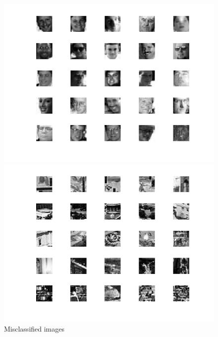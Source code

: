 \documentclass[a4paper,12pt]{article}
\begin{document}
\begin{figure}[H]
\centering
\caption{Misclassified images}\label{fig:missclassified_faces}
  \begin{minipage}[]{0.8\textwidth}
  \includegraphics[width=\textwidth]{figures/missclassified_faces.png}
  \end{minipage}
    \begin{minipage}[]{0.8\textwidth}
  \includegraphics[width=\textwidth]{figures/missclassified_non_faces.png}
  \end{minipage}
\end{figure}
\end{document}
